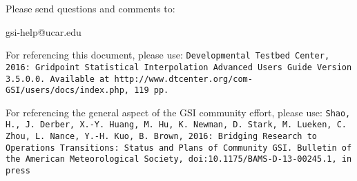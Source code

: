 \begin{titlepage}
\begin{flushleft}
Please send questions and comments to:
\begin{center}
gsi-help@ucar.edu
\end{center}

For referencing this document, please use:
\texttt{Developmental Testbed Center, 2016: Gridpoint Statistical Interpolation Advanced User\textquotesingle s Guide Version 3.5.0.0. Available at http://www.dtcenter.org/com-GSI/users/docs/index.php, 119 pp.}

For referencing the general aspect of the GSI community effort, please use: 
\texttt{Shao, H., J. Derber, X.-Y. Huang, M. Hu, K. Newman, D. Stark, M. Lueken, C. Zhou, L. Nance, Y.-H. Kuo, B. Brown, 2016:  Bridging Research to Operations Transitions:  Status and Plans of Community GSI. Bulletin of the American Meteorological Society, doi:10.1175/BAMS-D-13-00245.1, in press}

\end{flushleft}
\end{titlepage}
\pagebreak{}




